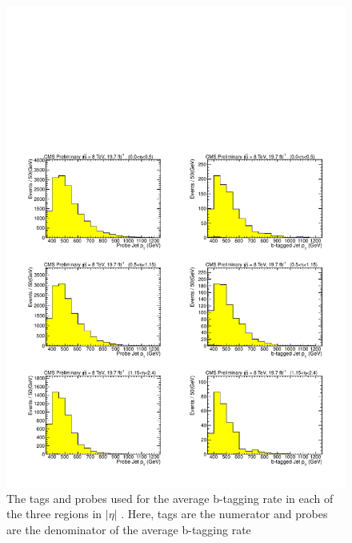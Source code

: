 \begin{figure}[htcb]
\centering
\includegraphics[width=1.0\textwidth]{AN-13-004/figs/tagsandprobes}
\caption{The tags and probes used for the average b-tagging rate in each of the three regions in $|\eta|$ .  Here, tags are the numerator and probes are the denominator of the average b-tagging rate}
\label{figs:tagsandprobes8TeV}
\end{figure}


